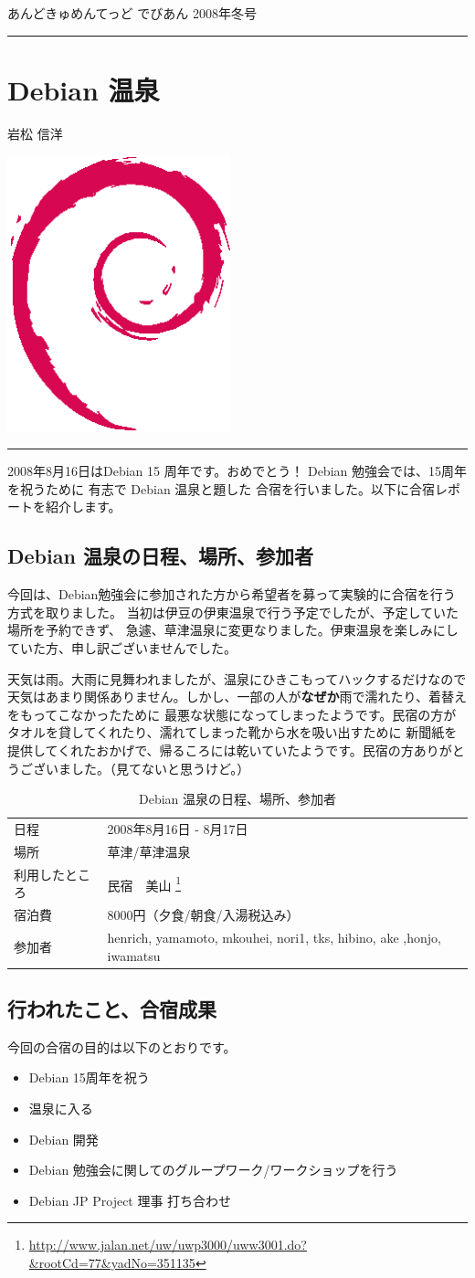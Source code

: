 \documentclass[mingoth,a4paper]{jsarticle}
\renewcommand{\dancersection}[2]{%
\newpage
あんどきゅめんてっど でびあん 2008年冬号
%
\vspace{0.1mm}\\
{\color{dancerlightblue}\rule{\hsize}{2mm}}

%
%
\begin{minipage}[t]{0.6\hsize}
\color{dancerdarkblue}
\vspace{1cm}
\section{#1}
\hfill{}#2\\
\end{minipage}
\begin{minipage}[t]{0.4\hsize}
\vspace{-2cm}
\hfill{}\includegraphics[height=8cm]{image200502/openlogo-nd.eps}\\
\vspace{-5cm}
\end{minipage}
%
%
{\color{dancerdarkblue}\rule{0.74\hsize}{2mm}}
%
\vspace{2cm}
}
\begin{document}
\dancersection{Debian 温泉}{岩松 信洋}
\label{sec:debian-onsen}

2008年8月16日はDebian 15 周年です。おめでとう！ Debian 勉強会では、15周年を祝うために
有志で Debian 温泉と題した 合宿を行いました。以下に合宿レポートを紹介します。

\subsection{Debian 温泉の日程、場所、参加者}
今回は、Debian勉強会に参加された方から希望者を募って実験的に合宿を行う方式を取りました。
当初は伊豆の伊東温泉で行う予定でしたが、予定していた場所を予約できず、
急遽、草津温泉に変更なりました。伊東温泉を楽しみにしていた方、申し訳ございませんでした。

天気は雨。大雨に見舞われましたが、温泉にひきこもってハックするだけなので
天気はあまり関係ありません。しかし、一部の人が{\bf なぜか}雨で濡れたり、着替えをもってこなかったために
最悪な状態になってしまったようです。民宿の方がタオルを貸してくれたり、濡れてしまった靴から水を吸い出すために
新聞紙を提供してくれたおかげで、帰るころには乾いていたようです。民宿の方ありがとうございました。（見てないと思うけど。）

\begin{table}[h]
 \begin{center}
 {
   \begin{tabular}{l|l} \hline
     日程 & 2008年8月16日 - 8月17日  \\
     場所 & 草津/草津温泉 \\
     利用したところ & 民宿　美山 \footnote{\url{http://www.jalan.net/uw/uwp3000/uww3001.do?&rootCd=77&yadNo=351135}}\\
     宿泊費 & 8000円（夕食/朝食/入湯税込み）\\
     参加者 & henrich, yamamoto, mkouhei, nori1, tks, hibino, ake ,honjo, iwamatsu\\
   \end{tabular}
 }
 \caption{Debian 温泉の日程、場所、参加者}
 \label{onsen-data}
 \end{center}
\end{table}

\subsection{行われたこと、合宿成果}

今回の合宿の目的は以下のとおりです。

\begin{itemize}
\item Debian 15周年を祝う
\item 温泉に入る
\item Debian 開発
\item Debian 勉強会に関してのグループワーク/ワークショップを行う
\item Debian JP Project 理事 打ち合わせ
\end{itemize}
\end{document}

